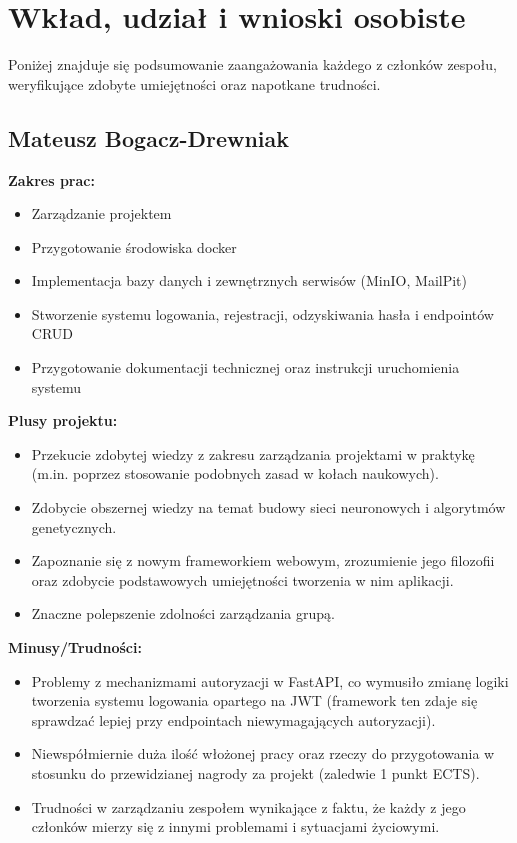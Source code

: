 \documentclass[12pt,a4paper]{article}
\begin{document}
\section{Wkład, udział i wnioski osobiste}
Poniżej znajduje się podsumowanie zaangażowania każdego z członków zespołu, weryfikujące zdobyte umiejętności oraz napotkane trudności.

\subsection{Mateusz Bogacz-Drewniak}
\textbf{Zakres prac:} 
\begin{itemize}
    \item Zarządzanie projektem
    \item Przygotowanie środowiska docker
    \item Implementacja bazy danych i zewnętrznych serwisów (MinIO, MailPit)
    \item Stworzenie systemu logowania, rejestracji, odzyskiwania hasła i endpointów CRUD
    \item Przygotowanie dokumentacji technicznej oraz instrukcji uruchomienia systemu
\end{itemize} 
\textbf{Plusy projektu:} 
\begin{itemize}
    \item Przekucie zdobytej wiedzy z zakresu zarządzania projektami w praktykę (m.in. poprzez stosowanie podobnych zasad w kołach naukowych).
    \item Zdobycie obszernej wiedzy na temat budowy sieci neuronowych i algorytmów genetycznych.
    \item Zapoznanie się z nowym frameworkiem webowym, zrozumienie jego filozofii oraz zdobycie podstawowych umiejętności tworzenia w nim aplikacji.
    \item Znaczne polepszenie zdolności zarządzania grupą.
\end{itemize}
\textbf{Minusy/Trudności:} 
\begin{itemize}
    \item Problemy z mechanizmami autoryzacji w FastAPI, co wymusiło zmianę logiki tworzenia systemu logowania opartego na JWT (framework ten zdaje się sprawdzać lepiej przy endpointach niewymagających autoryzacji).
    \item Niewspółmiernie duża ilość włożonej pracy oraz rzeczy do przygotowania w stosunku do przewidzianej nagrody za projekt (zaledwie 1 punkt ECTS).
    \item Trudności w zarządzaniu zespołem wynikające z faktu, że każdy z jego członków mierzy się z innymi problemami i sytuacjami życiowymi.
\end{itemize}
\end{document}
